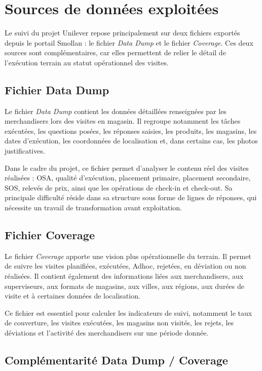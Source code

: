 \section{Sources de données exploitées}

Le suivi du projet Unilever repose principalement sur deux fichiers exportés depuis le portail Smollan : le fichier \textit{Data Dump} et le fichier \textit{Coverage}. Ces deux sources sont complémentaires, car elles permettent de relier le détail de l’exécution terrain au statut opérationnel des visites.

\subsection{Fichier Data Dump}

Le fichier \textit{Data Dump} contient les données détaillées renseignées par les merchandisers lors des visites en magasin. Il regroupe notamment les tâches exécutées, les questions posées, les réponses saisies, les produits, les magasins, les dates d’exécution, les coordonnées de localisation et, dans certains cas, les photos justificatives.

Dans le cadre du projet, ce fichier permet d’analyser le contenu réel des visites réalisées : OSA, qualité d’exécution, placement primaire, placement secondaire, SOS, relevés de prix, ainsi que les opérations de check-in et check-out. Sa principale difficulté réside dans sa structure sous forme de lignes de réponses, qui nécessite un travail de transformation avant exploitation.

\subsection{Fichier Coverage}

Le fichier \textit{Coverage} apporte une vision plus opérationnelle du terrain. Il permet de suivre les visites planifiées, exécutées, Adhoc, rejetées, en déviation ou non réalisées. Il contient également des informations liées aux merchandisers, aux superviseurs, aux formats de magasins, aux villes, aux régions, aux durées de visite et à certaines données de localisation.

Ce fichier est essentiel pour calculer les indicateurs de suivi, notamment le taux de couverture, les visites exécutées, les magasins non visités, les rejets, les déviations et l’activité des merchandisers sur une période donnée.

\subsection{Complémentarité Data Dump / Coverage}

